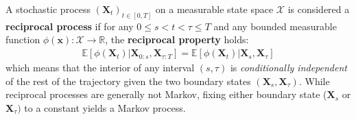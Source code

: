 \documentclass{article}
\begin{document}
\begin{proposition}\label{eq:prop:reciprocal-process}
    A stochastic process $(\boldsymbol{X}_t)_{t\in[0,T]}$ on a measurable state space $\mathcal{X}$ is considered a \textbf{reciprocal process} if for any $0\le s<t<\tau\le T$ and any bounded measurable function $\phi(\boldsymbol{x}):\mathcal{X}\to\mathbb R$, the \textbf{reciprocal property} holds:
    \begin{align}
    \mathbb E[\phi(\boldsymbol{X}_t)| \boldsymbol{X}_{0:s},\boldsymbol{X}_{\tau :T}]= \mathbb E[\phi(\boldsymbol{X}_t)| \boldsymbol{X}_s,\boldsymbol{X}_\tau ]\tag{Reciprocal Property}\label{eq:reciprocal-property}
    \end{align}
    which means that the interior of any interval $(s,\tau)$ is \textit{conditionally independent} of the rest of the trajectory given the two boundary states $(\boldsymbol{X}_s,\boldsymbol{X}_\tau)$. While reciprocal processes are generally not Markov, fixing either boundary state ($\boldsymbol{X}_s$ or $\boldsymbol{X}_\tau)$ to a constant yields a Markov process. 
\end{proposition}
\end{document}
